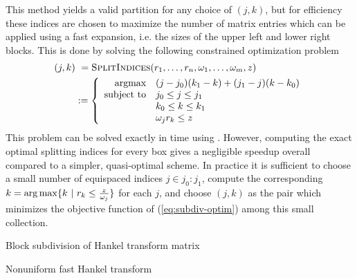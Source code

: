 This method yields a valid partition for any choice of $(j,k)$, but for
efficiency these indices are chosen to maximize the number of matrix entries
which can be applied using a fast expansion, i.e. the sizes of the upper left
and lower right blocks. This is done by solving the following constrained
optimization problem
\begin{align}
    (j,k) 
    &\ = \textsc{SplitIndices}(r_1,\dots,r_n, \omega_1,\dots,\omega_m, z) \\
    &:= \left\{
        \begin{array}{r@{\quad } l}
        \text{argmax} & (j-j_0)(k_1-k) + (j_1-j)(k-k_0)   \\
        \text{subject to} & j_0 \leq j \leq j_1 \\ 
        & k_0 \leq k \leq k_1 \\ 
        & \omega_j r_k \leq z
        \end{array}
    \right. \label{eq:subdiv-optim}
\end{align}
This problem can be solved exactly in  time
using . However, computing the exact optimal splitting indices
for every box gives a negligible speedup overall compared to a simpler,
quasi-optimal scheme. In practice it is sufficient to choose a small number of
equispaced indices $j \in j_0:j_1$, compute the corresponding $k = \operatorname*{arg\,max} \{k \
| \ r_k \leq \frac{z}{\omega_j}\}$ for each $j$, and choose $(j,k)$ as the pair
which minimizes the objective function of (\ref{eq:subdiv-optim}) among this
small collection.

\begin{algorithm2e}[t]
    \caption{Block subdivision of Hankel transform
    matrix}\label{alg:subdivision}
    
\end{algorithm2e}

\begin{algorithm2e}[t]
    \caption{Nonuniform fast Hankel transform}\label{alg:nufht}
    
\end{algorithm2e}

